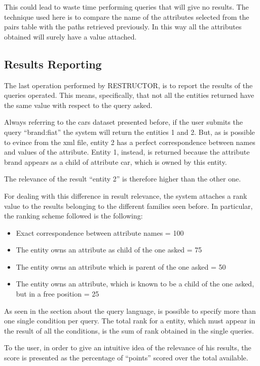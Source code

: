 \documentclass{acm_proc_article-sp-sigmod07}
\begin{document}
This could lead to waste time performing queries that will give no
results. The technique used here is to compare the name of the attributes
selected from the pairs table with the paths retrieved previously. In this
way all the attributes obtained will surely have a value attached.

\subsection{Results Reporting}
The last operation performed by RESTRUCTOR, is to report the results of
the queries operated. This means, specifically, that not all the entities
returned have the same value with respect to the query asked.

Always referring to the cars dataset presented before, if the user submits
the query ``brand:fiat'' the system will return the entities 1 and 2.
But, as is possible to evince from the xml file, entity 2 has a perfect
correspondence between names and values of the attribute. Entity 1,
instead, is returned because the attribute brand appears as a child of 
attribute car, which is owned by this entity.

The relevance of the result ``entity 2'' is therefore higher than the
other one.

For dealing with this difference in result relevance, the system attaches
a rank value to the results belonging to the different families seen
before. In particular, the ranking scheme followed is the following:
\begin{itemize}
\item Exact correspondence between attribute names = 100
\item The entity owns an attribute as child of the one asked = 75
\item The entity owns an attribute which is parent of the one asked = 50
\item The entity owns an attribute, which is known to be a child of the
one asked, but in a free position = 25
\end{itemize}

As seen in the section about the query language, is possible to specify
more than one single condition per query. The total rank for a entity,
which must appear in the result of all the conditions, is the sum of rank
obtained in the single queries.

To the user, in order to give an intuitive idea of the relevance of his
results, the score is presented as the percentage of ``points'' scored
over the total available.
\end{document}

